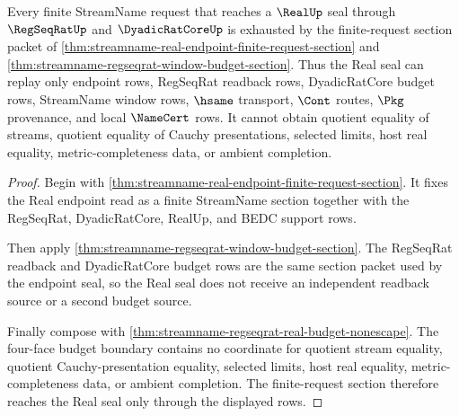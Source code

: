\begin{theorem}
\label{thm:streamname-real-seal-request-section-nonescape}
Every finite StreamName request that reaches a $\RealUp$ seal through
$\RegSeqRatUp$ and $\DyadicRatCoreUp$ is exhausted by the finite-request
section packet of
\autoref{thm:streamname-real-endpoint-finite-request-section} and
\autoref{thm:streamname-regseqrat-window-budget-section}. Thus the Real seal
can replay only endpoint rows, RegSeqRat readback rows, DyadicRatCore budget
rows, StreamName window rows, $\hsame$ transport, $\Cont$ routes, $\Pkg$
provenance, and local $\NameCert$ rows. It cannot obtain quotient equality of
streams, quotient equality of Cauchy presentations, selected limits, host real
equality, metric-completeness data, or ambient completion.
\end{theorem}
\begin{proof}
Begin with
\autoref{thm:streamname-real-endpoint-finite-request-section}. It fixes the
Real endpoint read as a finite StreamName section together with the RegSeqRat,
DyadicRatCore, RealUp, and BEDC support rows.

Then apply \autoref{thm:streamname-regseqrat-window-budget-section}. The
RegSeqRat readback and DyadicRatCore budget rows are the same section packet
used by the endpoint seal, so the Real seal does not receive an independent
readback source or a second budget source.

Finally compose with
\autoref{thm:streamname-regseqrat-real-budget-nonescape}. The four-face
budget boundary contains no coordinate for quotient stream equality, quotient
Cauchy-presentation equality, selected limits, host real equality,
metric-completeness data, or ambient completion. The finite-request section
therefore reaches the Real seal only through the displayed rows.
\end{proof}

